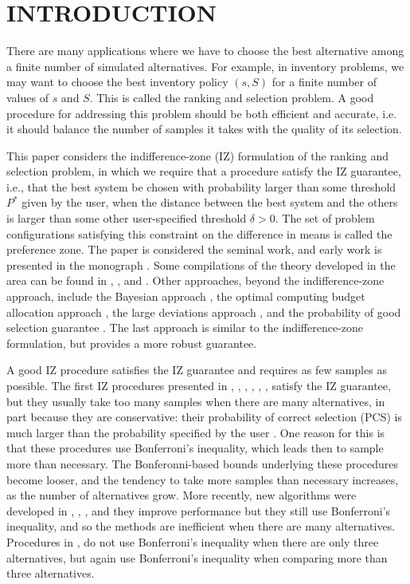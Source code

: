 \documentclass{wscpaperproc}
\theoremstyle{wsc}
\begin{document}
\section{INTRODUCTION}
\label{sec:intro}


There are many applications where we have to choose the best alternative
among a finite number of simulated alternatives. For example, in inventory problems, we may want to choose the best inventory policy $(s,S)$ for a finite number of values of $s$ and $S$. 
This is called the ranking and selection problem.
A good procedure for addressing this problem should be both efficient and accurate, i.e. it should balance the number of samples it takes with the quality of its selection.

This paper considers the indifference-zone (IZ) formulation of the ranking and selection problem, in which we require that a procedure satisfy the IZ guarantee, i.e., that the best system be chosen with probability larger than some threshold $P^*$ given by the user, when the distance between the best system and the others is larger than some other user-specified threshold $\delta>0$.  The set of problem configurations satisfying this constraint on the difference in means is called the preference zone.
The paper  is considered the seminal work, and early work is 
presented in the monograph . Some compilations of the theory developed in the area can be found
in , ,  and . Other approaches, beyond the indifference-zone approach, include the Bayesian approach \cite{Frazier:Tutorial}, the optimal computing budget allocation approach \cite{chen:ocva}, the large deviations approach \cite{glynn2004large}, and the probability of good selection guarantee \cite{nelson2001selecting}. The last approach is similar to the indifference-zone formulation, but provides a more robust guarantee.


A good IZ procedure satisfies the IZ guarantee and requires as few samples as possible.
The first IZ procedures presented in , , , ,
, ,  
satisfy the IZ guarantee, but they usually take too many samples when there are many alternatives,
in part because they are conservative: their probability of correct selection (PCS) is much
larger than the probability specified by the user \cite{Kim:Conserv}. One reason for this
is that these procedures use Bonferroni's inequality, which leads then to sample more
than necessary. The Bonferonni-based bounds underlying these procedures become looser, and the tendency to take more samples than necessary increases, as the number of alternatives grow.
More recently, new algorithms were developed in , , 
, and they improve performance but they still
use Bonferroni's inequality, and so the methods are inefficient
when there are many alternatives. Procedures in ,
 do not use Bonferroni's inequality 
when there are only three alternatives, but again use Bonferroni's inequality when 
comparing more than three alternatives.
\end{document}
